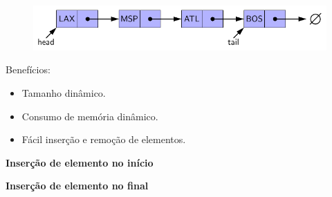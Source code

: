 \begin{figure}[H]
	\centering
	\includegraphics[width=0.9\linewidth]{img/figure-3-11}
\end{figure}

Benefícios:
\begin{itemize}
	\item Tamanho dinâmico.
	\item Consumo de memória dinâmico.
	\item Fácil inserção e remoção de elementos.
\end{itemize}

\bigskip

\textbf{Inserção de elemento no início}

\begin{figure}[H]
	\centering
	\setlength{\fboxsep}{0pt}
	\setlength{\fboxrule}{0pt}
	
	
	
\end{figure}

\textbf{Inserção de elemento no final}

